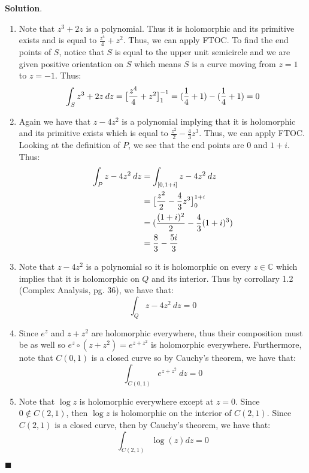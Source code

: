 \documentclass[12pt]{article}
\renewcommand{\=}[1]{\stackrel{#1}{=}} %
\theoremstyle{definition}
\theoremstyle{definition}
\newenvironment{s}{%
        \begin{trivlist} \item \textbf{Solution}. }{%
            \hspace*{\fill} $\blacksquare$\end{trivlist}}%
\begin{document}
\begin{s}
    \begin{enumerate}
        \item Note that $z^3+2z$ is a polynomial. Thus it is holomorphic and its primitive exists and is equal to
            $\frac{z^4}{4} + z^2$. Thus, we can apply FTOC. To find the end points of $S$, notice that
            $S$ is equal to the upper unit semicircle and we are given positive orientation on $S$
            which means $S$ is a curve moving from $z=1$ to $z=-1$. Thus:
            \[ \int_S z^3+2z\:dz = \big{[}\frac{z^4}{4}+z^2\big{]}_1^{-1} = (\frac{1}{4}+1) - (\frac{1}{4}+1) = 0\]
        \item Again we have that $z-4z^2$ is a polynomial implying that it is holomorphic and its primitive exists which is equal
            to $\frac{z^2}{2}-\frac{4}{3}z^3$. Thus, we can apply FTOC. Looking at the definition of $P$, we see that the end points
            are $0$ and $1+i$. Thus:
            \begin{align*}
                \int_P z-4z^2\:dz &= \int_{[0,1+i]} z-4z^2\:dz \\
                &= \big{[}\frac{z^2}{2} - \frac{4}{3}z^3\big{]}_0^{1+i} \\
                &= (\frac{(1+i)^2}{2}-\frac{4}{3}(1+i)^3) \\
                &= \frac{8}{3} - \frac{5i}{3}
            \end{align*}
        \item Note that $z-4z^2$ is a polynomial so it is holomorphic on every $z\in\mathbb{C}$ which implies that it is holomorphic
            on $Q$ and its interior. Thus by corrollary 1.2 (Complex Analysis, pg. 36), we have that:
            \[ \int_Q z-4z^2\:dz = 0 \]
        \item Since $e^z$ and $z+z^2$ are holomorphic everywhere, thus their composition must be as well so $e^z\circ (z+z^2) 
            = e^{z+z^2}$ is holomorphic everywhere. Furthermore, note that $C(0,1)$ is a closed curve so by Cauchy's theorem,
            we have that:
            \[ \int_{C(0,1)} e^{z+z^2}\:dz = 0 \]
        \item Note that $\log{z}$ is holomorphic everywhere except at $z=0$. Since $0\not\in C(2,1)$, then $\log{z}$ is holomorphic
            on the interior of $C(2,1)$. Since $C(2,1)$ is a closed curve, then by Cauchy's theorem, we have that:
            \[ \int_{C(2,1)} \log{(z)}dz = 0 \]
    \end{enumerate}
\end{s}
\end{document}
